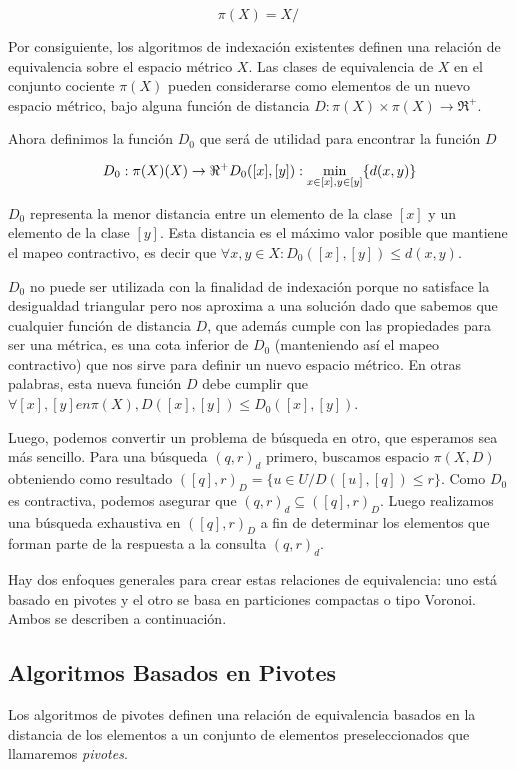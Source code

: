 \[
\pi(X) = X/~
\]


Por consiguiente, los algoritmos de indexaci\'on existentes definen una relaci\'on de equivalencia 
sobre el espacio m\'etrico $X$. Las clases de equivalencia de $X$ en el conjunto cociente $\pi(X)$ 
pueden considerarse como elementos de un nuevo espacio m\'etrico, bajo alguna funci\'on de 
distancia $D: \pi(X)  \times \pi(X) \rightarrow  \Re^+$.

Ahora definimos la funci\'on $D_0$ que ser\'a de utilidad para encontrar la funci\'on $D$

\[
D_0: 	\pi(X) \time \pi(X)  \rightarrow \Re^+
D_0([x],[y]): \min_{x \in [x], y \in [y]}\{d(x,y)\}
\]
			
$D_0$ representa la menor distancia entre un elemento de la clase $[x]$ y un elemento de la clase 
$[y]$. Esta distancia es el m\'aximo valor posible que mantiene el mapeo contractivo, es decir que 
$\forall x,y \in X : D_0([x],[y]) \leq d(x,y)$.
					
$D_0$ no puede ser utilizada con la finalidad de indexaci\'on porque no satisface la desigualdad 
triangular pero nos aproxima a una soluci\'on dado que sabemos que cualquier funci\'on de 
distancia $D$, que adem\'as cumple con las propiedades para ser una m\'etrica, es una cota 
inferior de $D_0$ (manteniendo as\'i el mapeo contractivo) que nos sirve para definir un nuevo 
espacio m\'etrico. En otras palabras, esta nueva funci\'on $D$ debe cumplir que $\forall [x],[y] 
en \pi(X),  D([x],[y]) \leq D_0([x],[y])$.

Luego, podemos convertir un problema de b\'usqueda en otro, que esperamos sea m\'as sencillo. 
Para una b\'usqueda $(q, r)_d$ primero, buscamos espacio $\pi(X, D)$ obteniendo como resultado $([q], r)_D = \{u \in  U/ D([u],[q]) \leq r\}$. Como $D_0$  es contractiva, podemos asegurar que $(q, r)_d \subseteq ([q], r)_D$.  Luego realizamos una b\'usqueda exhaustiva en $([q], r)_D$ a fin de determinar los elementos que forman parte de la respuesta a la consulta $(q, r)_d$.
				
Hay dos enfoques generales para crear estas relaciones de equivalencia: uno est\'a basado en pivotes y el otro se basa en particiones compactas o tipo Voronoi. Ambos se describen a continuaci\'on.

\subsection{Algoritmos Basados en Pivotes}

Los algoritmos de pivotes definen una relaci\'on de equivalencia basados en la distancia de los elementos a un conjunto de elementos preseleccionados que llamaremos \textit{pivotes}.

